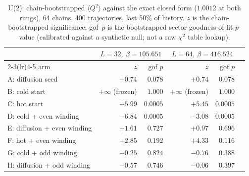 \begin{table}[htbp]
\centering
\caption{U(2): chain-bootstrapped $\langle Q^2\rangle$ against the exact
closed form ($1.0012$ at both rungs), 64 chains, 400 trajectories, last
50\% of history. $z$ is the chain-bootstrapped significance; gof~$p$ is
the bootstrapped sector goodness-of-fit $p$-value (calibrated against a
synthetic null; not a raw $\chi^2$ table lookup).}
\label{tab:u2_topology}
\begin{tabular}{lrrrrr}
\toprule
& \multicolumn{2}{c}{$L=32,\ \beta=105.651$} & \multicolumn{2}{c}{$L=64,\ \beta=416.524$} \\
\cmidrule(lr){2-3}\cmidrule(lr){4-5}
arm & $z$ & gof $p$ & $z$ & gof $p$ \\
\midrule
A: diffusion seed              & $+0.74$ & $0.078$ & $+0.74$ & $0.078$ \\
B: cold start                  & $+\infty$ (frozen) & $1.000$ & $+\infty$ (frozen) & $1.000$ \\
C: hot start                   & $+5.99$ & $0.0005$ & $+5.45$ & $0.0005$ \\
D: cold + even winding         & $-6.84$ & $0.0005$ & $-3.08$ & $0.0005$ \\
E: diffusion + even winding    & $+1.61$ & $0.727$  & $+0.97$ & $0.696$ \\
F: hot + even winding          & $+2.85$ & $0.192$  & $+4.33$ & $0.116$ \\
G: cold + odd winding          & $+0.25$ & $0.824$  & $-0.76$ & $0.388$ \\
H: diffusion + odd winding     & $-0.57$ & $0.746$  & $-0.06$ & $0.397$ \\
\bottomrule
\end{tabular}
\end{table}

